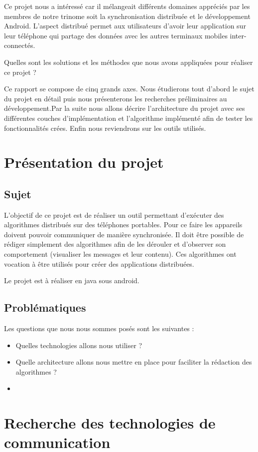 \documentclass[a4paper,10pt]{report}
\begin{document}
  Ce projet nous a intéressé car il mélangeait différents domaines appréciés par les membres de notre trinome soit la synchronisation distribuée et le développement Android.
  L'aspect distribué permet aux utilisateurs d'avoir leur application sur leur téléphone qui partage des données avec les autres terminaux mobiles inter-connectés.
  
  Quelles sont les solutions et les méthodes que nous avons appliquées pour réaliser ce projet ?
  
  Ce rapport se compose de cinq grands axes. Nous étudierons tout d'abord le sujet du projet en détail puis nous présenterons les recherches préliminaires au développement.Par la suite nous allons décrire l'architecture du projet avec ses différentes couches d'implémentation et l'algorithme implémenté afin de tester les fonctionnalités crées. Enfin nous reviendrons sur les outils utilisés.
\chapter{Présentation du projet}
  \section{Sujet}
  L'objectif de ce projet est de réaliser un outil permettant d'exécuter des algorithmes distribués sur des téléphones portables. Pour ce faire les appareils doivent pouvoir communiquer de manière synchronisée. Il doit être possible de rédiger simplement des algorithmes afin de les dérouler et d'observer son comportement (visualiser les messages et leur contenu). Ces algorithmes ont vocation à être utilisés pour créer des applications distribuées.
  
  Le projet est à réaliser en java sous android.
  \section{Problématiques}
  Les questions que nous nous sommes posés sont les suivantes : 
  \begin{itemize}
    \item Quelles technologies allons nous utiliser ?
    \item Quelle architecture allons nous mettre en place pour faciliter la rédaction des algorithmes ?
    \item {}
  \end{itemize}
\chapter{Recherche des technologies de communication}
\end{document}

